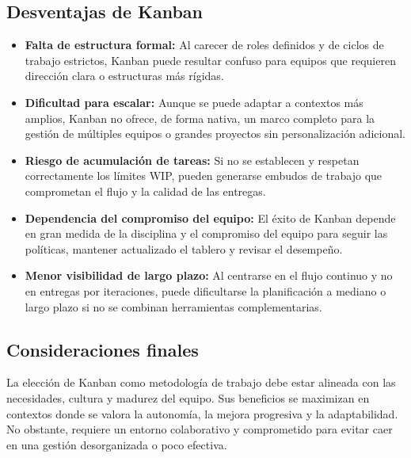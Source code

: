 \subsection{Desventajas de Kanban}

\begin{itemize}
    \item \textbf{Falta de estructura formal:} Al carecer de roles definidos y de ciclos de trabajo estrictos, Kanban puede resultar confuso para equipos que requieren dirección clara o estructuras más rígidas.
    
    \item \textbf{Dificultad para escalar:} Aunque se puede adaptar a contextos más amplios, Kanban no ofrece, de forma nativa, un marco completo para la gestión de múltiples equipos o grandes proyectos sin personalización adicional.
    
    \item \textbf{Riesgo de acumulación de tareas:} Si no se establecen y respetan correctamente los límites WIP, pueden generarse embudos de trabajo que comprometan el flujo y la calidad de las entregas.
    
    \item \textbf{Dependencia del compromiso del equipo:} El éxito de Kanban depende en gran medida de la disciplina y el compromiso del equipo para seguir las políticas, mantener actualizado el tablero y revisar el desempeño.
    
    \item \textbf{Menor visibilidad de largo plazo:} Al centrarse en el flujo continuo y no en entregas por iteraciones, puede dificultarse la planificación a mediano o largo plazo si no se combinan herramientas complementarias.
\end{itemize}

\subsection{Consideraciones finales}

La elección de Kanban como metodología de trabajo debe estar alineada con las necesidades, cultura y madurez del equipo. Sus beneficios se maximizan en contextos donde se valora la autonomía, la mejora progresiva y la adaptabilidad. No obstante, requiere un entorno colaborativo y comprometido para evitar caer en una gestión desorganizada o poco efectiva.

